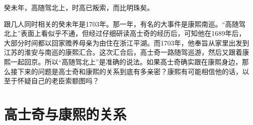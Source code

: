 
\begin{bookquote}癸未年，高随驾北上，时高已叛索，而比明珠矣。\end{bookquote}


跟几人同时相关的癸未年是1703年。那一年，有名的大事件是康熙南巡。“高随驾北上”表面上看似乎不通，但经过仔细研读高士奇的经历后，可知他在1689年后，大部分时间都以回家赡养母亲为由住在浙江平湖。而1703年，他奉旨从家里出发到江苏的淮安与南巡的康熙汇合。这次汇合后，高士奇一路随驾巡游，然后又跟着康熙一起回京。所以“高随驾北上”是准确的说法。如果高士奇确实跟在康熙身边，那么接下来的问题是高士奇和康熙的关系到底有多亲密？康熙有可能相信他的话，以至于怀疑自己的老臣索额图吗？


\begin{sectionnotes}














\end{sectionnotes}
\section{高士奇与康熙的关系}

